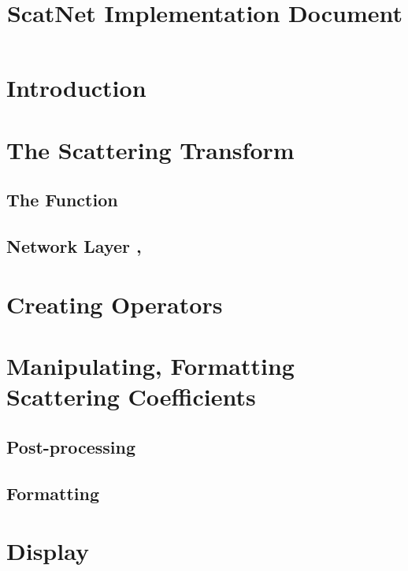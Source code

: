 \documentclass[twocolumn]{article}
\title{ScatNet Implementation Document}
\begin{document}
	
\maketitle

\section{Introduction}

\section{The Scattering Transform}

\subsection{The  Function}

\subsection{Network Layer , }

\section{Creating Operators}

\subsection{}

\subsection{}

\section{Manipulating, Formatting Scattering Coefficients}

\subsection{Post-processing}

\subsection{Formatting}

\section{Display}
\end{document}
